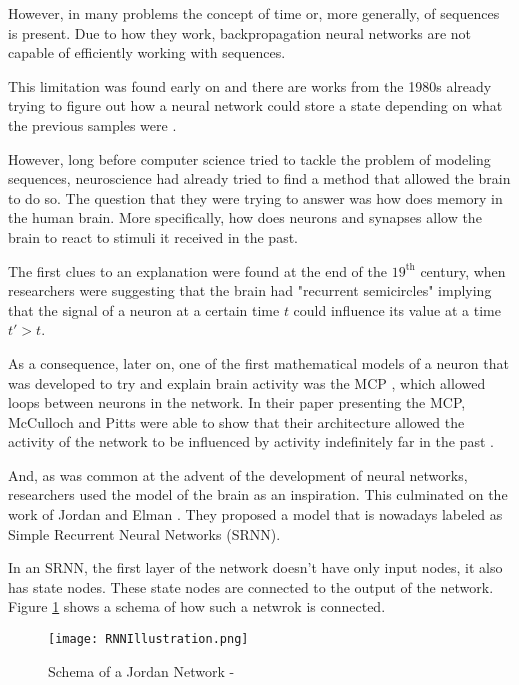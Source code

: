 However, in many problems the concept of time or, more generally, of sequences is present.
Due to how they work, backpropagation neural networks are not capable of efficiently working with sequences.

This limitation was found early on and there are works from the 1980s already trying to figure out how a neural network could store a state depending on what the previous samples were \cite{jordan1986serial}.

However, long before computer science tried to tackle the problem of modeling sequences, neuroscience had already tried to find a method that allowed the brain to do so.
The question that they were trying to answer was how does memory in the human brain.
More specifically, how does neurons and synapses allow the brain to react to stimuli it received in the past.

The first clues to an explanation were found at the end of the $19^{\text{th}}$ century, when researchers were suggesting that the brain had "recurrent semicircles" \cite{espinosa2025importance} implying that the signal of a neuron at a certain time $t$ could influence its value at a time $t' > t$.

As a consequence, later on, one of the first mathematical models of a neuron that was developed to try and explain brain activity was the MCP \cite{mcculloch1943logical}, which allowed loops between neurons in the network.
In their paper presenting the MCP, McCulloch and Pitts were able to show that their architecture allowed the activity of the network to be influenced by activity indefinitely far in the past \cite{mcculloch1943logical}.

And, as was common at the advent of the development of neural networks, researchers used the model of the brain as an inspiration.
This culminated on the work of Jordan \cite{jordan1986serial} and Elman \cite{elman1990finding}.
They proposed a model that is nowadays labeled as Simple Recurrent Neural Networks (SRNN).

In an SRNN, the first layer of the network doesn't have only input nodes, it also has state nodes.
These state nodes are connected to the output of the network.
Figure \ref{fig:RNNIllustration} shows a schema of how such a netwrok is connected.

\begin{figure}
    \begin{center}
        \texttt{[image: RNNIllustration.png]}
        \caption[Schema of a Jordan Network]{Schema of a Jordan Network - \cite{elman1990finding}}
        \label{fig:RNNIllustration}
    \end{center}
\end{figure}

